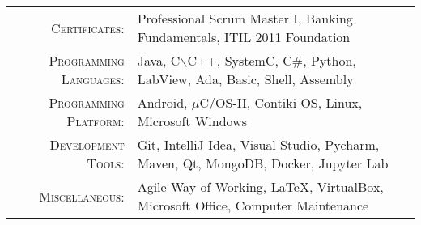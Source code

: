 %
%
%

\renewcommand{\arraystretch}{1.1}

	\begin{tabular}{>{}r>{}p{13cm}} 
		\textsc{Certificates:}					& Professional Scrum Master I, Banking Fundamentals, ITIL 2011 Foundation \\
		\textsc{Programming Languages:}  		&   Java, C$\backslash$C++, SystemC, C\#, Python, LabView, Ada, Basic, Shell, Assembly\\ 
		\textsc{Programming Platform:}          & Android, $\mu$C/OS-II, Contiki OS, Linux, Microsoft Windows\\ 
		\textsc{Development Tools:}	  		&   Git, IntelliJ Idea, Visual Studio, Pycharm, Maven, Qt, MongoDB, Docker, Jupyter Lab\\
        \textsc{Miscellaneous:}				&   Agile Way of Working, \LaTeX, VirtualBox, Microsoft Office, Computer Maintenance\\
	\end{tabular}